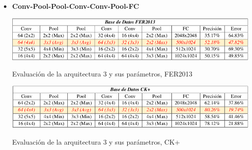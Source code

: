 \begin{itemize}
{}

\item {\textbf{Conv-Pool-Pool-Conv-Conv-Pool-FC}

\begin{table}[H]
    \centering
    \includegraphics[width=140mm]{./Imagenes/tabla_arqui_3_fer.png} 
    \caption{Evaluación de la arquitectura 3 y sus parámetros, FER2013}
    \label{tab:tabla_arqui_3_fer}
\end{table}

\begin{table}[H]
    \centering
    \includegraphics[width=140mm]{./Imagenes/tabla_arqui_3_CK.png}
    \caption{Evaluación de la arquitectura 3 y sus parámetros, CK+}
    \label{tab:tabla_arqui_3_CK}
\end{table}
}

\end{itemize}

